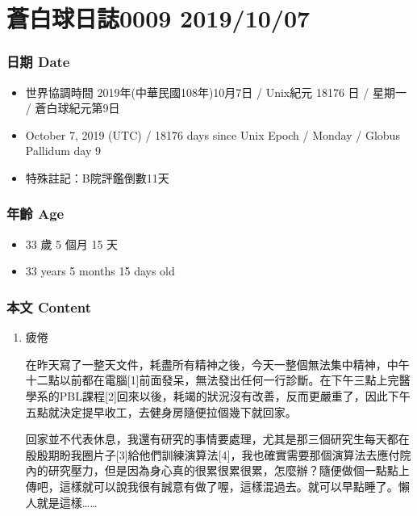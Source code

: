 \documentclass[
]{article}
\providecommand{\tightlist}{%
  \setlength{\itemsep}{0pt}\setlength{\parskip}{0pt}}
\begin{document}
\hypertarget{ux84bcux767dux7403ux65e5ux8a8c0009-20191007}{%
\section{蒼白球日誌0009
2019/10/07}\label{ux84bcux767dux7403ux65e5ux8a8c0009-20191007}}

\hypertarget{ux65e5ux671f-date-6}{%
\subsubsection{日期 Date}\label{ux65e5ux671f-date-6}}

\begin{itemize}
\tightlist
\item
  世界協調時間 2019年(中華民國108年)10月7日 / Unix紀元 18176 日 / 星期一
  / 蒼白球紀元第9日
\item
  October 7, 2019 (UTC) / 18176 days since Unix Epoch / Monday / Globus
  Pallidum day 9
\item
  特殊註記：B院評鑑倒數11天
\end{itemize}

\hypertarget{ux5e74ux9f61-age-6}{%
\subsubsection{年齡 Age}\label{ux5e74ux9f61-age-6}}

\begin{itemize}
\tightlist
\item
  33 歲 5 個月 15 天
\item
  33 years 5 months 15 days old
\end{itemize}

\hypertarget{ux672cux6587-content-6}{%
\subsubsection{本文 Content}\label{ux672cux6587-content-6}}

\begin{enumerate}
\def\labelenumi{\arabic{enumi}.}
\item
  疲倦

  在昨天寫了一整天文件，耗盡所有精神之後，今天一整個無法集中精神，中午十二點以前都在電腦{[}1{]}前面發呆，無法發出任何一行診斷。在下午三點上完醫學系的PBL課程{[}2{]}回來以後，耗竭的狀況沒有改善，反而更嚴重了，因此下午五點就決定提早收工，去健身房隨便拉個幾下就回家。

  回家並不代表休息，我還有研究的事情要處理，尤其是那三個研究生每天都在殷殷期盼我圈片子{[}3{]}給他們訓練演算法{[}4{]}，我也確實需要那個演算法去應付院內的研究壓力，但是因為身心真的很累很累很累，怎麼辦？隨便做個一點點上傳吧，這樣就可以說我很有誠意有做了喔，這樣混過去。就可以早點睡了。懶人就是這樣\ldots\ldots{}
\end{enumerate}
\end{document}
